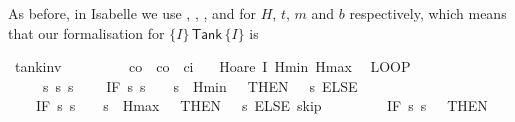\documentclass[envcountsame]{llncs}
\begin{document}
\begin{example}
As before, in Isabelle we use , , , and  for $H$, $t$, $m$ and $b$ respectively, which means that our formalisation for $\{I\}\, \mathsf{Tank}\, \{I\}$ is
\begin{isabellebody}
\isanewline
{}\isamarkupfalse%
\ tank{\isacharunderscore}inv{\isacharcolon}\isanewline
\ \ \ {\isachardoublequoteopen}{}\ {\isasymle}\ {\isasymtau}{\isachardoublequoteclose}\ \ {\isachardoublequoteopen}{}\ {\isacharless}\ c\isactrlsub o{\isachardoublequoteclose}\ \ {\isachardoublequoteopen}c\isactrlsub o\ {\isacharless}\ c\isactrlsub i{\isachardoublequoteclose}\isanewline
\ \ \ {\isachardoublequoteopen}Hoare\ {\isasymlceil}I\ Hmin\ Hmax{\isasymrceil}\isanewline
\ \ {\isacharparenleft}LOOP\ \isanewline
\ \ \ \ %
\isanewline
\ \ \ \ {\isacharparenleft}{\isacharparenleft}{}\ {\isacharcolon}{\isacharcolon}{\isacharequal}{\isacharparenleft}{\isasymlambda}s{\isachardot}{}{\isacharparenright}{\isacharparenright}{\isacharsemicolon}{\isacharparenleft}{}\ {\isacharcolon}{\isacharcolon}{\isacharequal}{\isacharparenleft}{\isasymlambda}s{\isachardot}\ s{\isachardollar}{}{\isacharparenright}{\isacharparenright}{\isacharsemicolon}\isanewline
\ \ \ \ {\isacharparenleft}IF\ {\isacharparenleft}{\isasymlambda}s{\isachardot}\ s{\isachardollar}{}\ {\isacharequal}\ {}\ {\isasymand}\ s{\isachardollar}{}\ {\isasymle}\ Hmin\ {\isacharplus}\ {}{\isacharparenright}\ THEN\ {\isacharparenleft}{}\ {\isacharcolon}{\isacharcolon}{\isacharequal}\ {\isacharparenleft}{\isasymlambda}s{\isachardot}{}{\isacharparenright}{\isacharparenright}\ ELSE\ \isanewline
\ \ \ \ {\isacharparenleft}IF\ {\isacharparenleft}{\isasymlambda}s{\isachardot}\ s{\isachardollar}{}\ {\isacharequal}\ {}\ {\isasymand}\ s{\isachardollar}{}\ {\isasymge}\ Hmax\ {\isacharminus}\ {}{\isacharparenright}\ THEN\ {\isacharparenleft}{}\ {\isacharcolon}{\isacharcolon}{\isacharequal}\ {\isacharparenleft}{\isasymlambda}s{\isachardot}{}{\isacharparenright}{\isacharparenright}\ ELSE\ skip{\isacharparenright}{\isacharparenright}{\isacharsemicolon}\isanewline
\ \ \ \ %
\isanewline
\ \ \ \ {\isacharparenleft}IF\ {\isacharparenleft}{\isasymlambda}s{\isachardot}\ s{\isachardollar}{}\ {\isacharequal}\ {}{\isacharparenright}\ THEN\ \isanewline

\end{isabellebody}
\end{example}
\end{document}
